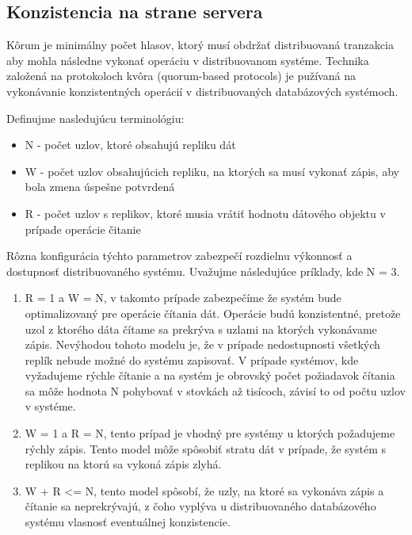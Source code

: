 \documentclass[11pt,twoside,a4paper]{book}
\begin{document}
\subsection{Konzistencia na strane servera}
Kôrum je minimálny počet hlasov, ktorý musí obdržať distribuovaná tranzakcia aby mohla následne vykonať operáciu v distribuovanom systéme. Technika založená na protokoloch kvôra (quorum-based protocols) je pužívaná na vykonávanie konzistentných operácií v distribuovaných databázových systémoch.

Definujme nasledujúcu terminológiu:
\begin{itemize}
 \item N - počet uzlov, ktoré obsahujú repliku dát
 \item W - počet uzlov obsahujúcich repliku, na ktorých sa musí vykonať zápis, aby bola zmena úspešne potvrdená
 \item R - počet uzlov s replikov, ktoré musia vrátiť hodnotu dátového objektu v prípade operácie čitanie
\end{itemize}

Rôzna konfigurácia týchto parametrov zabezpečí rozdielnu výkonnosť a dostupnosť distribuovaného systému. Uvažujme následujúce príklady, kde N = 3.

\begin{enumerate}
 \item R = 1 a W = N, v takomto prípade zabezpečíme že systém bude optimalizovaný pre operácie čítania dát. Operácie budú konzistentné, pretože uzol z ktorého dáta čítame sa prekrýva s uzlami na ktorých vykonávame zápis. Nevýhodou tohoto modelu je, že v prípade nedostupnosti všetkých replík nebude možné do systému zapisovať. V prípade systémov, kde vyžadujeme rýchle čítanie a na systém je obrovský počet požiadavok čítania sa môže hodnota N pohybovať v stovkách až tisícoch, závisí to od počtu uzlov v systéme.
 \item W = 1 a R = N, tento prípad je vhodný pre systémy u ktorých požadujeme rýchly zápis. Tento model môže spôsobiť stratu dát v prípade, že systém s replikou na ktorú sa vykoná zápis zlyhá. 
 \item W + R <= N, tento model spôsobí, že uzly, na ktoré sa vykonáva zápis a čítanie sa neprekrývajú, z čoho vyplýva u distribuovaného databázového systému vlasnosť eventuálnej konzistencie. 
\end{enumerate}
\end{document}
